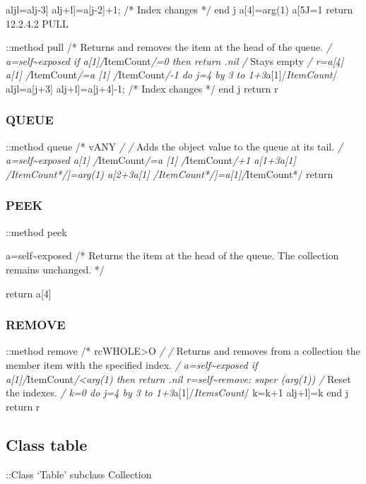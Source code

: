 aljl=alj-3{]} alj+l{]}=a{[}j-2{]}+1; /* Index changes */ end j
a{[}4{]}=arg(1) a{[}5J=1 return 12.2.4.2 PULL

::method pull /* Returns and removes the item at the head of the queue.
\emph{/ a=self\textasciitilde exposed if a{[}1{]}/}ItemCount\emph{/=0
then return .nil /} Stays empty \emph{/ r=a{[}4{]} a{[}1{]}
/}ItemCount\emph{/=a {[}1{]} /}ItemCount\emph{/-1 do j=4 by 3 to
1+3}a{[}1{]}/\emph{ItemCount}/ aljl=a{[}j+3{]} alj+l{]}=a{[}j+4{]}-1; /*
Index changes */ end j return r

\subsubsection{QUEUE}\label{queue}

::method queue /* vANY \emph{/ /} Adds the object value to the queue at
its tail. \emph{/ a=self\textasciitilde exposed a{[}1{]}
/}ItemCount\emph{/=a {[}1{]} /}ItemCount\emph{/+1 a{[}1+3\emph{a{[}1{]}
/}ItemCount*/{]}=arg(1) a{[}2+3\emph{a{[}1{]}
/}ItemCount*/{]}=a{[}1{]}/}ItemCount*/ return

\subsubsection{PEEK}\label{peek}

::method peek

a=self\textasciitilde exposed /* Returns the item at the head of the
queue. The collection remains unchanged. */

return a{[}4{]}

\subsubsection{REMOVE}\label{remove-1}

::method remove /* rcWHOLE\textgreater O \emph{/ /} Returns and removes
from a collection the member item with the specified index. \emph{/
a=self\textasciitilde exposed if
a{[}1{]}/}ItemCount\emph{/\textless arg(1) then return .nil
r=self\textasciitilde remove: super (arg(1)) /} Reset the indexes.
\emph{/ k=0 do j=4 by 3 to 1+3}a{[}1{]}/\emph{ItemsCount}/ k=k+1
alj+l{]}=k end j return r

\subsection{Class table}\label{class-table}

::Class `Table' subclass Collection

